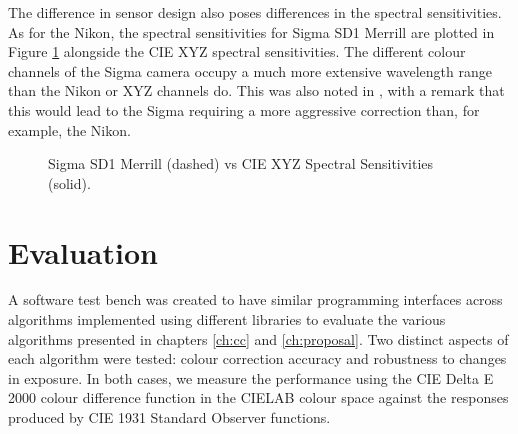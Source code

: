 The difference in sensor design also poses differences in the spectral sensitivities. As for the Nikon, the spectral sensitivities for Sigma SD1 Merrill are plotted in Figure \ref{fig:sigma} alongside the CIE XYZ spectral sensitivities. The different colour channels of the Sigma camera occupy a much more extensive wavelength range than the Nikon or XYZ channels do. This was also noted in \cite{finlayson2015color}, with a remark that this would lead to the Sigma requiring a more aggressive correction than, for example, the Nikon.

\begin{figure}
    \centering
    \caption{Sigma SD1 Merrill \cite{D5100NPL} (dashed) vs CIE XYZ \cite{cie1931} Spectral Sensitivities (solid).}
    \label{fig:sigma}
\end{figure}



\section{Evaluation}

A software test bench was created to have similar programming interfaces across algorithms implemented using different libraries to evaluate the various algorithms presented in chapters \ref{ch:cc} and \ref{ch:proposal}. Two distinct aspects of each algorithm were tested: colour correction accuracy and robustness to changes in exposure. In both cases, we measure the performance using the CIE Delta E 2000 colour difference function in the CIELAB colour space against the responses produced by CIE 1931 Standard Observer functions.

